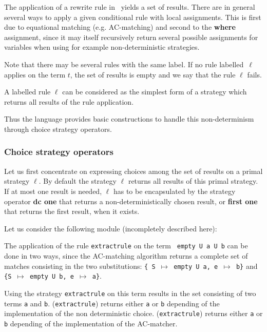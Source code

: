 The application of a rewrite rule in \elan\ yields a set of results. There are
in general several ways to apply a given conditional rule with local
assignments.  This is first due to equational matching (e.g.  AC-matching) and
second to the {\bf where} assignment, since it may itself recursively return
several possible assignments for variables when using for example
non-deterministic strategies.

Note that there may be several rules with the same label.  If no rule
labelled~$\ell$ applies on the term $t$, the set of results is empty and we say
that the rule $\ell$ fails.

A labelled rule $\ell$ can be considered as the simplest form of a strategy
which returns all results of the rule application.

Thus the language provides basic constructions to handle this non-determinism
through choice strategy operators.


\subsubsection{Choice strategy operators}

Let us first concentrate on expressing choices among the set of
results on a primal strategy $\ell$.  By default the strategy $\ell$
returns all results of this primal strategy.  If at most one result is
needed, $\ell$ has to be encapsulated by the strategy operator 
{\bf dc one} that returns a non-deterministically chosen result, or 
{\bf first one} that returns the first result, when it exists.

\EX Let us consider the following module (incompletely described here):

The application of the rule {\tt extractrule} on the term {\tt
empty U a U b} can be done in two ways, since the AC-matching
algorithm returns a complete set of matches consisting in the two
substitutions: 
{\tt \{ S $\mapsto$ empty U a, e $\mapsto$ b\}} and
{\tt \{S $\mapsto$ empty U b, e $\mapsto$ a\}}.

Using the strategy {\tt extractrule} on this term results in the set
consisting of two terms {\tt a} and {\tt b}.
({\tt extractrule}) returns either {\tt a} or {\tt b} depending 
of the implementation of the non deterministic choice.
({\tt extractrule}) returns either {\tt a} or {\tt b} depending 
of the implementation of the AC-matcher.

\FEX

